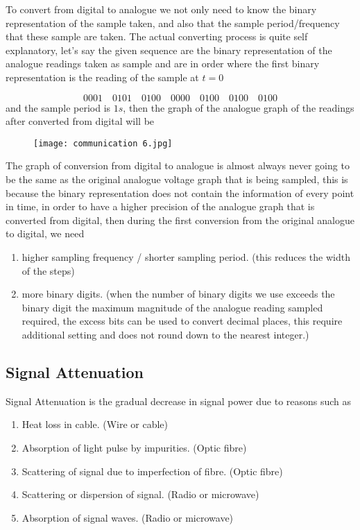 \documentclass{article}
\begin{document}
To convert from digital to analogue we not only need to know the binary representation of the sample taken, and also that the sample period/frequency that these sample are taken. The actual converting process is quite self explanatory, let's say the given sequence are the binary representation of the analogue readings taken as sample and are in order where the first binary representation is the reading of the sample at $t=0$

$$0001 \quad0101\quad 0100 \quad0000 \quad 0100 \quad0100\quad0100$$
and the sample period is $1s$, then the graph of the analogue graph of the readings after converted from digital will be  
\begin{figure}[H]
    \centering
    \texttt{[image: communication 6.jpg]}
\end{figure}
The graph of conversion from digital to analogue is almost always never going to be the same as the original analogue voltage graph that is being sampled, this is because the binary representation does not contain the information of every point in time, in order to have a higher precision of the analogue graph that is converted from digital, then during the first conversion from the original analogue to digital, we need 
\begin{enumerate}
    \item higher sampling frequency / shorter sampling period. (this reduces the width of the steps)
    \item more binary digits. (when the number of binary digits we use exceeds the binary digit the maximum magnitude of the analogue reading sampled required, the excess bits can be used to convert decimal places, this require additional setting and does not round down to the nearest integer.)
\end{enumerate}


\subsection{Signal Attenuation}

Signal Attenuation is the gradual decrease in signal power due to reasons such as
\begin{enumerate}
    \item Heat loss in cable. (Wire or cable)
    \item Absorption of light pulse by impurities. (Optic fibre)
    \item Scattering of signal due to imperfection of fibre. (Optic fibre)
    \item Scattering or dispersion of signal. (Radio or microwave)
    \item Absorption of signal waves. (Radio or microwave)
\end{enumerate}
\end{document}

